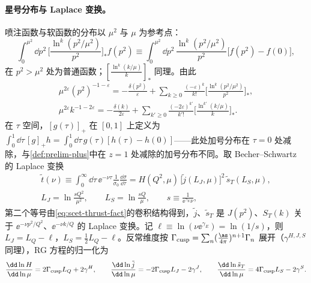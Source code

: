 \paragraph{星号分布与 Laplace 变换。}
喷注函数与软函数的分布以 $\mu^2$ 与 $\mu$ 为参考点：
\[
\int_0^{\mu^2}\dd p^2\,\Big[\frac{\ln^k(p^2/\mu^2)}{p^2}\Big]_*f(p^2)\equiv\int_0^{\mu^2}\dd p^2\,\frac{\ln^k(p^2/\mu^2)}{p^2}\big[f(p^2)-f(0)\big],
\]
在 $p^2>\mu^2$ 处为普通函数；$[\frac{\ln^k(k/\mu)}{k}]_*$ 同理。由此
\begin{equation}\label{eq:scet-distid}
\begin{gathered}
\mu^{2\varepsilon}(p^2)^{-1-\varepsilon}=-\frac{\delta(p^2)}{\varepsilon}+\sum_{k\ge0}\frac{(-\varepsilon)^k}{k!}\Big[\frac{\ln^k(p^2/\mu^2)}{p^2}\Big]_*,\\
\mu^{2\varepsilon}k^{-1-2\varepsilon}=-\frac{\delta(k)}{2\varepsilon}+\sum_{k'\ge0}\frac{(-2\varepsilon)^{k'}}{k'!}\Big[\frac{\ln^{k'}(k/\mu)}{k}\Big]_* .
\end{gathered}
\end{equation}
在 $\tau$ 空间，$[g(\tau)]_+$ 在 $[0,1]$ 上定义为 $\int_0^1\dd\tau\,[g]_+h=\int_0^1\dd\tau\,g(\tau)[h(\tau)-h(0)]$——此处加号分布在 $\tau=0$ 处减除，与\cref{def:prelim-plus}中在 $z=1$ 处减除的加号分布不同。取 Becher--Schwartz 的 Laplace 变换\cite[附录~B]{BecherSchwartz2008}
\begin{equation}\label{eq:scet-laplace}
\begin{gathered}
\tilde t(\nu)\equiv\int_0^\infty\dd\tau\,\ee^{-\nu\tau}\frac{1}{\sigma_0}\frac{\dd\sigma}{\dd\tau}=H(Q^2,\mu)\,\big[\tilde j(L_J,\mu)\big]^2\,\tilde s_T(L_S,\mu),\\
L_J=\ln\frac{sQ^2}{\mu^2},\qquad L_S=\ln\frac{sQ}{\mu},\qquad s\equiv\frac{1}{\ee^{\gamma_E}\nu},
\end{gathered}
\end{equation}
第二个等号由\cref{eq:scet-thrust-fact}的卷积结构得到，$\tilde j$、$\tilde s_T$ 是 $J(p^2)$、$S_T(k)$ 关于 $\ee^{-\nu p^2/Q^2}$、$\ee^{-\nu k/Q}$ 的 Laplace 变换。记 $\ell\equiv\ln(\nu\ee^{\gamma_E})=\ln(1/s)$，则 $L_J=L_Q-\ell$，$L_S=\frac12L_Q-\ell$。反常维度按 $\Gamma_{\rm cusp}=\sum_n(\frac{\as}{4\pi})^{n+1}\Gamma_n$ 展开（$\gamma^{H,J,S}$ 同理），RG 方程的归一化为
\begin{equation}\label{eq:scet-RGE}
\frac{\dd\ln H}{\dd\ln\mu}=2\Gamma_{\rm cusp}L_Q+2\gamma^H,\qquad
\frac{\dd\ln\tilde j}{\dd\ln\mu}=-2\Gamma_{\rm cusp}L_J-2\gamma^J,\qquad
\frac{\dd\ln\tilde s_T}{\dd\ln\mu}=4\Gamma_{\rm cusp}L_S-2\gamma^S .
\end{equation}

